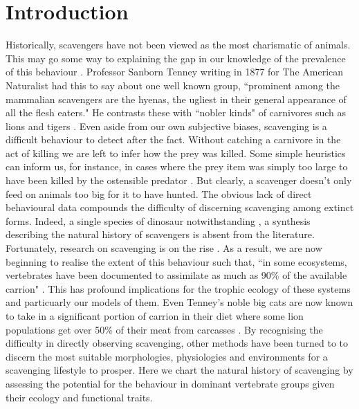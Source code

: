 \documentclass[a4paper,12pt]{article}
\begin{document}
\section*{Introduction}
Historically, scavengers have not been viewed as the most charismatic of animals.
This may go some way to explaining the gap in our knowledge of the prevalence of this behaviour \citep{devault2003scavenging}.
Professor Sanborn Tenney writing in 1877 for The American Naturalist had this to say about one well known group, ``prominent among the mammalian scavengers are the hyenas, the ugliest in their general appearance of all the flesh eaters."
He contrasts these with ``nobler kinds" of carnivores such as lions and tigers \citep{tenney1877few}.
Even aside from our own subjective biases, scavenging is a difficult behaviour to detect after the fact.
Without catching a carnivore in the act of killing we are left to infer how the prey was killed.
Some simple heuristics can inform us, for instance, in cases where the prey item was simply too large to have been killed by the ostensible predator \citep{pobiner2008paleoecological}.
But clearly, a scavenger doesn’t only feed on animals too big for it to have hunted.
The obvious lack of direct behavioural data compounds the difficulty of discerning scavenging among extinct forms.
Indeed, a single species of dinosaur notwithstanding \citep{carbone2011intra}, a synthesis describing the natural history of scavengers is absent from the literature.
Fortunately, research on scavenging is on the rise \citep{manga2006vulture}.
As a result, we are now beginning to realise the extent of this behaviour such that, ``in some ecosystems, vertebrates have been documented to assimilate as much as 90\% of the available carrion" \citep{beasley2015vertebrates}.
This has profound implications for the trophic ecology of these systems and particuarly our models of them.
Even Tenney’s noble big cats are now known to take in a significant portion of carrion in their diet where some lion populations get over 50\% of their meat from carcasses \citep{jones2015african}.
By recognising the difficulty in directly observing scavenging, other methods have been turned to to discern the most suitable morphologies, physiologies and environments for a scavenging lifestyle to prosper.
Here we chart the natural history of scavenging by assessing the potential for the behaviour in dominant vertebrate groups given their ecology and functional traits.
\end{document}
